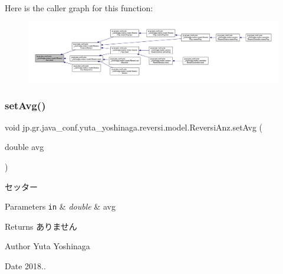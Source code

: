 Here is the caller graph for this function\+:
\nopagebreak
\begin{figure}[H]
\begin{center}
\leavevmode
\includegraphics[width=350pt]{classjp_1_1gr_1_1java__conf_1_1yuta__yoshinaga_1_1reversi_1_1model_1_1_reversi_anz_ab87a68776fedd66e0fa8bed2c24d461b_icgraph}
\end{center}
\end{figure}
\mbox{\label{classjp_1_1gr_1_1java__conf_1_1yuta__yoshinaga_1_1reversi_1_1model_1_1_reversi_anz_a951e5d9f08cdfeae668b8cd9adaa38ab}} 
\subsubsection{\texorpdfstring{set\+Avg()}{setAvg()}}
{\footnotesize\ttfamily void jp.\+gr.\+java\+\_\+conf.\+yuta\+\_\+yoshinaga.\+reversi.\+model.\+Reversi\+Anz.\+set\+Avg (\begin{DoxyParamCaption}\item[{double}]{avg }\end{DoxyParamCaption})}



セッター 


\begin{DoxyParams}[1]{Parameters}
\mbox{\tt in}  & {\em double} & avg \\
\hline
\end{DoxyParams}
\begin{DoxyReturn}{Returns}
ありません 
\end{DoxyReturn}
\begin{DoxyAuthor}{Author}
Yuta Yoshinaga 
\end{DoxyAuthor}
\begin{DoxyDate}{Date}
2018.. 
\end{DoxyDate}



